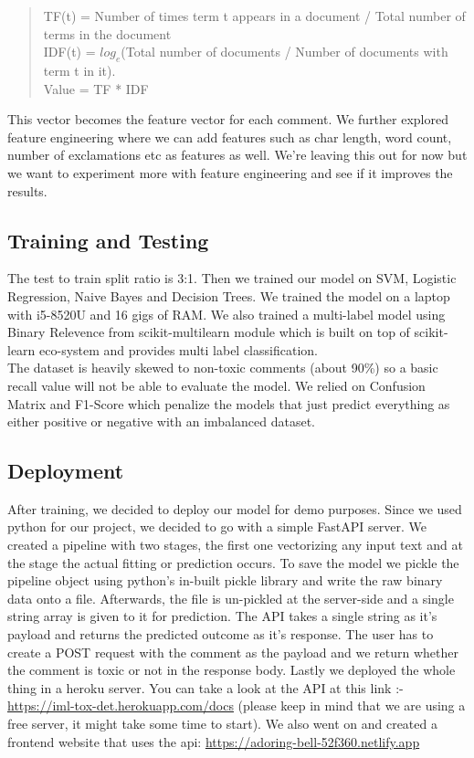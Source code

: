\documentclass[11pt]{article}
\begin{document}
\begin{quote}
TF(t) = Number of times term t appears in a document / Total number of terms in the document\\
IDF(t) = $log_e$(Total number of documents / Number of documents with term t in it). \\
Value = TF * IDF
\end{quote}
This vector becomes the feature vector for each comment. We further explored feature engineering where we can add features such as char length, word count, number of exclamations etc as features as well. We're leaving this out for now but we want to experiment more with feature engineering and see if it improves the results.

\subsection*{Training and Testing}
The test to train split ratio is 3:1. Then we trained our model on SVM, Logistic Regression, Naive Bayes and Decision Trees.
We trained the model on a laptop with i5-8520U and 16 gigs of RAM.
We also trained a multi-label model using Binary Relevence from scikit-multilearn module 
which is built on top of scikit-learn eco-system and provides multi label classification. \\
The dataset is heavily skewed to non-toxic comments (about 90\%) so a basic recall value will not be able to evaluate the model. We relied on Confusion Matrix and F1-Score which penalize the  models that just predict everything as either positive or negative with an imbalanced dataset.

\subsection*{Deployment}
After training, we decided to deploy our model for demo purposes. 
Since we used python for our project, we decided to go with a simple FastAPI server.
We created a pipeline with two stages, the first one vectorizing any
input text and at the stage the actual fitting or prediction occurs. 
To save the model we pickle the pipeline object using python's in-built 
pickle library and write the raw binary data onto a file. 
Afterwards, the file is un-pickled at the server-side and a single string 
array is given to it for prediction. 
The API takes a single string as it's payload and returns the predicted outcome 
as it's response. The user has to create a POST request with the comment as the 
payload and we return whether the comment is toxic or not in the response body.
Lastly we deployed the whole thing in a heroku server.
You can take a look at the API at this link 
:- \url{https://iml-tox-det.herokuapp.com/docs}
(please keep in mind that we are using a free server, it might take some time to start). 
We also went on and created a frontend website that uses the api: 
\url{https://adoring-bell-52f360.netlify.app}
\end{document}
